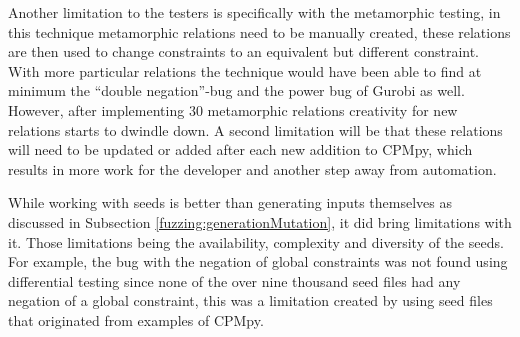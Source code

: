 Another limitation to the testers is specifically with the metamorphic testing, in this technique metamorphic relations need to be manually created, these relations are then used to change constraints to an equivalent but different constraint. With more particular relations the technique would have been able to find at minimum the “double negation”-bug and the power bug of Gurobi as well. However, after implementing 30 metamorphic relations creativity for new relations starts to dwindle down. A second limitation will be that these relations will need to be updated or added after each new addition to CPMpy, which results in more work for the developer and another step away from automation.


While working with seeds is better than generating inputs themselves as discussed in Subsection \ref{fuzzing:generationMutation}, it did bring limitations with it. Those limitations being the availability, complexity and diversity of the seeds. For example, the bug with the negation of global constraints was not found using differential testing since none of the over nine thousand seed files had any negation of a global constraint, this was a limitation created by using seed files that originated from examples of CPMpy.




